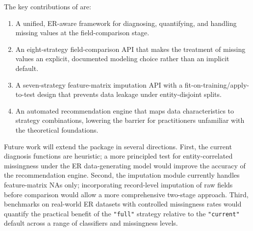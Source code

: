 \documentclass[a4paper]{article}
\begin{document}
\begin{article}
The key contributions of  are:

\begin{enumerate}
  \item A unified, ER-aware framework for diagnosing, quantifying, and
    handling missing values at the field-comparison stage.
  \item An eight-strategy field-comparison API that makes the treatment
    of missing values an explicit, documented modeling choice rather
    than an implicit default.
  \item A seven-strategy feature-matrix imputation API with a
    fit-on-training/apply-to-test design that prevents data leakage
    under entity-disjoint splits.
  \item An automated recommendation engine that maps data
    characteristics to strategy combinations, lowering the
    barrier for practitioners unfamiliar with the theoretical
    foundations.
\end{enumerate}

Future work will extend the package in several directions.  First, the
current diagnosis functions are heuristic; a more principled test for
entity-correlated missingness under the ER data-generating model would
improve the accuracy of the recommendation engine.  Second, the
imputation module currently handles feature-matrix NAs only; incorporating
record-level imputation of raw fields before comparison would allow a
more comprehensive two-stage approach.  Third, benchmarks on real-world
ER datasets with controlled missingness rates would quantify the
practical benefit of the \texttt{"full"} strategy relative to the
\texttt{"current"} default across a range of classifiers and missingness
levels.







\end{article}
\end{document}
